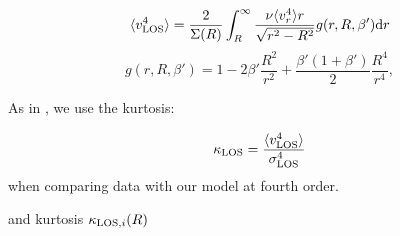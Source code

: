 \begin{equation}
    \label{eqn:kappa}
    \langle{v_{\rm LOS}^4}\rangle = \frac{2}{\Sigma(R)}\int_R^\infty
    \frac{\nu \langle {v_r^4}\rangle r}{\sqrt{r^2-R^2}}g(r,R,\beta')\text{d}r
\end{equation}
\begin{equation*}
    \label{eqn:g}
    g(r,R,\beta') = 1-2\beta'\frac{R^2}{r^2}+\frac{\beta'(1+\beta')}{2}\frac{R^4}{r^4},
\end{equation*}

 As in \cite{Lokas+2005}, we use the kurtosis:

\begin{equation*}
    \kappa_{\rm LOS}=\frac{\langle{v_{\rm LOS}^4}\rangle}{\sigma_{\rm LOS}^4}
\end{equation*}
when comparing data with our model at fourth order.

and kurtosis
$\kappa_{{\rm LOS},i}(R)$
